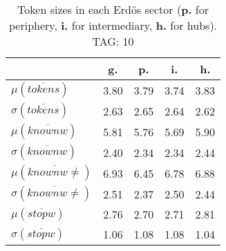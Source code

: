 \begin{table}[h!]
\begin{center}
\begin{tabular}{| l || c | c | c | c |}\hline
 & {\bf g.} & {\bf p.} & {\bf i.} & {\bf h.} \\\hline\hline
$\mu(\overline{tokens})$ & 3.80  & 3.79  & 3.74  & 3.83 \\
$\sigma(\overline{tokens})$ & 2.63  & 2.65  & 2.64  & 2.62 \\\hline
$\mu(\overline{knownw})$ & 5.81  & 5.76  & 5.69  & 5.90 \\
$\sigma(\overline{knownw})$ & 2.40  & 2.34  & 2.34  & 2.44 \\\hline
$\mu(\overline{knownw \neq})$ & 6.93  & 6.45  & 6.78  & 6.88 \\
$\sigma(\overline{knownw \neq})$ & 2.51  & 2.37  & 2.50  & 2.44 \\\hline
$\mu(\overline{stopw})$ & 2.76  & 2.70  & 2.71  & 2.81 \\
$\sigma(\overline{stopw})$ & 1.06  & 1.08  & 1.08  & 1.04 \\\hline
\end{tabular}
\caption{Token sizes in each Erd\"os sector ({{\bf p.}} for periphery, {{\bf i.}} for intermediary, {{\bf h.}} for hubs). TAG: 10}
\end{center}
\end{table}